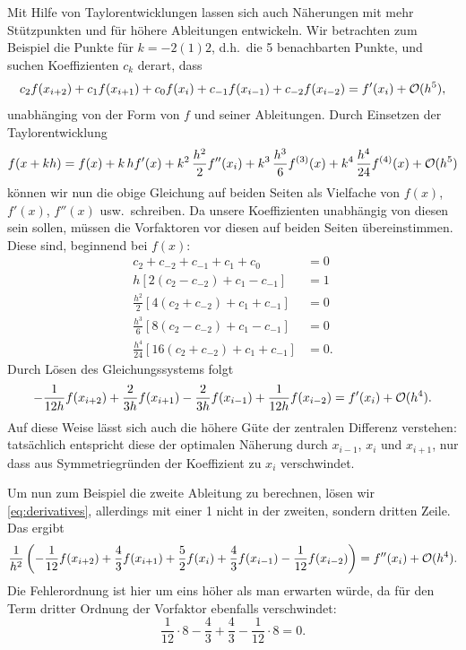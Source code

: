 Mit Hilfe von Taylorentwicklungen lassen sich auch Näherungen mit mehr
Stützpunkten und für höhere Ableitungen entwickeln.  Wir betrachten
zum Beispiel die Punkte für $k=-2(1)2$, d.h.\ die 5 benachbarten
Punkte, und suchen Koeffizienten $c_k$ derart, dass
\begin{equation}
  c_2 f(x_{i+2}) + c_1 f(x_{i+1})  + c_0 f(x_i) + c_{-1}f(x_{i-1}) +
  c_{-2}f(x_{i-2}) = f'(x_i) + \mathcal O(h^5),
\end{equation}
unabhänging von der Form von $f$ und seiner Ableitungen. Durch
Einsetzen der Taylorentwicklung
\begin{equation}
  f(x + k h) = f(x) + k\, hf'(x) + k^2\,\frac{h^2}{2} f''(x_i) +
  k^3\,\frac{h^3}{6}f^{(3)}(x) + k^4\,\frac{h^4}{24}f^{(4)}(x) + \mathcal O(h^5)
\end{equation}
können wir nun die obige Gleichung auf beiden Seiten als Vielfache von
$f(x)$, $f'(x)$, $f''(x)$ usw.\ schreiben. Da unsere Koeffizienten
unabhängig von diesen sein sollen, müssen die Vorfaktoren vor diesen
auf beiden Seiten übereinstimmen. Diese sind, beginnend bei $f(x)$:
\begin{align}
  \label{eq:derivatives}
  c_{2} + c_{-2} + c_{-1} + c_1 + c_0 &= 0\nonumber\\
  h\left[2 (c_{2} - c_{-2})  + c_{1} - c_{-1}\right] &= 1\nonumber\\
  \frac{h^2}{2}\left[4(c_{2} + c_{-2})  + c_{1} + c_{-1}\right] &= 0\nonumber\\
  \frac{h^3}{6}\left[8 (c_{2} - c_{-2})  + c_{1} - c_{-1}\right] &= 0\nonumber\\
  \frac{h^4}{24}\left[16 (c_{2} + c_{-2}) + c_{1} + c_{-1}\right] &= 0.
\end{align}
Durch Lösen des Gleichungssystems folgt
\begin{equation}
  \label{eq:4orderdiff}
  -\frac{1}{12h} f(x_{i+2}) + \frac{2}{3h} f(x_{i+1})  - \frac{2}{3h} f(x_{i-1}) +
  \frac{1}{12h}f(x_{i-2}) = f'(x_i) + \mathcal O(h^4).
\end{equation}
Auf diese Weise lässt sich auch die höhere Güte der zentralen
Differenz verstehen: tatsächlich entspricht diese der optimalen
Näherung durch $x_{i-1}$, $x_i$  und $x_{i+1}$, nur dass aus
Symmetriegründen der Koeffizient zu $x_i$ verschwindet.

Um nun zum Beispiel die zweite Ableitung zu berechnen, lösen wir
\eqref{eq:derivatives}, allerdings mit einer 1 nicht in der zweiten,
sondern dritten Zeile. Das ergibt
\begin{equation}
  \label{eq:3order2diff}
  \frac{1}{h^2}\left(-\frac{1}{12} f(x_{i+2}) + \frac{4}{3} f(x_{i+1}) +
  \frac{5}{2} f(x_i)  + \frac{4}{3} f(x_{i-1}) -
  \frac{1}{12}f(x_{i-2})\right) = f''(x_i) + \mathcal O(h^4).
\end{equation}
Die Fehlerordnung ist hier um eins höher als man erwarten würde, da für den
Term dritter Ordnung der Vorfaktor ebenfalls verschwindet:
\begin{equation}
  \frac{1}{12} \cdot 8 - \frac{4}{3} +
  \frac{4}{3} - \frac{1}{12}\cdot 8 = 0.
\end{equation}


